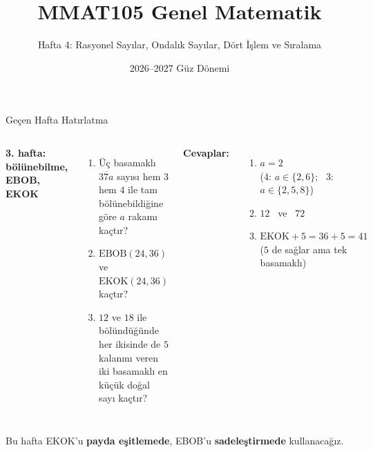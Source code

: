 \documentclass[aspectratio=169,11pt]{beamer}
\title[MMAT105 -- Hafta 4]{MMAT105 Genel Matematik}
\subtitle{Hafta 4: Rasyonel Sayılar, Ondalık Sayılar, Dört İşlem ve Sıralama}
\author{}
\date{2026--2027 Güz Dönemi}
\newcommand{\ab}[1]{\overline{#1}}
\begin{document}
\begin{frame}
\titlepage
\end{frame}


\begin{frame}{Geçen Hafta Hatırlatma}
\begin{columns}[t]
\textbf{3. hafta: bölünebilme, EBOB, EKOK}
\begin{enumerate}
\item Üç basamaklı \(\ab{37a}\) sayısı hem \(3\) hem \(4\) ile tam bölünebildiğine göre \(a\) rakamı kaçtır?
\item \(\text{EBOB}(24,36)\) ve \(\text{EKOK}(24,36)\) kaçtır?
\item \(12\) ve \(18\) ile bölündüğünde her ikisinde de \(5\) kalanını veren iki basamaklı en küçük doğal sayı kaçtır?
\end{enumerate}
\pause
\textbf{Cevaplar:}
\begin{enumerate}
\item \(a=2\) \\ {\small (\(4\): \(a\in\{2,6\}\); \ \(3\): \(a\in\{2,5,8\}\))}
\item \(12\) \ ve \ \(72\)
\item \(\text{EKOK}+5=36+5=41\) \\ {\small (\(5\) de sağlar ama tek basamaklı)}
\end{enumerate}
\end{columns}
\vspace{4pt}
\small Bu hafta EKOK'u \textbf{payda eşitlemede}, EBOB'u \textbf{sadeleştirmede} kullanacağız.
\end{frame}
\end{document}
